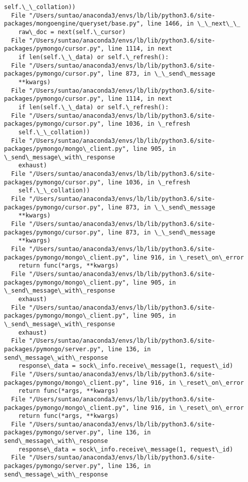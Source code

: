 \documentclass[11pt]{article}
\begin{document}
\begin{Verbatim}[commandchars=\\\{\}]
    self.\_\_collation))
  File "/Users/suntao/anaconda3/envs/lb/lib/python3.6/site-packages/mongoengine/queryset/base.py", line 1466, in \_\_next\_\_
    raw\_doc = next(self.\_cursor)
  File "/Users/suntao/anaconda3/envs/lb/lib/python3.6/site-packages/pymongo/cursor.py", line 1114, in next
    if len(self.\_\_data) or self.\_refresh():
  File "/Users/suntao/anaconda3/envs/lb/lib/python3.6/site-packages/pymongo/cursor.py", line 873, in \_\_send\_message
    **kwargs)
  File "/Users/suntao/anaconda3/envs/lb/lib/python3.6/site-packages/pymongo/cursor.py", line 1114, in next
    if len(self.\_\_data) or self.\_refresh():
  File "/Users/suntao/anaconda3/envs/lb/lib/python3.6/site-packages/pymongo/cursor.py", line 1036, in \_refresh
    self.\_\_collation))
  File "/Users/suntao/anaconda3/envs/lb/lib/python3.6/site-packages/pymongo/mongo\_client.py", line 905, in \_send\_message\_with\_response
    exhaust)
  File "/Users/suntao/anaconda3/envs/lb/lib/python3.6/site-packages/pymongo/cursor.py", line 1036, in \_refresh
    self.\_\_collation))
  File "/Users/suntao/anaconda3/envs/lb/lib/python3.6/site-packages/pymongo/cursor.py", line 873, in \_\_send\_message
    **kwargs)
  File "/Users/suntao/anaconda3/envs/lb/lib/python3.6/site-packages/pymongo/cursor.py", line 873, in \_\_send\_message
    **kwargs)
  File "/Users/suntao/anaconda3/envs/lb/lib/python3.6/site-packages/pymongo/mongo\_client.py", line 916, in \_reset\_on\_error
    return func(*args, **kwargs)
  File "/Users/suntao/anaconda3/envs/lb/lib/python3.6/site-packages/pymongo/mongo\_client.py", line 905, in \_send\_message\_with\_response
    exhaust)
  File "/Users/suntao/anaconda3/envs/lb/lib/python3.6/site-packages/pymongo/mongo\_client.py", line 905, in \_send\_message\_with\_response
    exhaust)
  File "/Users/suntao/anaconda3/envs/lb/lib/python3.6/site-packages/pymongo/server.py", line 136, in send\_message\_with\_response
    response\_data = sock\_info.receive\_message(1, request\_id)
  File "/Users/suntao/anaconda3/envs/lb/lib/python3.6/site-packages/pymongo/mongo\_client.py", line 916, in \_reset\_on\_error
    return func(*args, **kwargs)
  File "/Users/suntao/anaconda3/envs/lb/lib/python3.6/site-packages/pymongo/mongo\_client.py", line 916, in \_reset\_on\_error
    return func(*args, **kwargs)
  File "/Users/suntao/anaconda3/envs/lb/lib/python3.6/site-packages/pymongo/server.py", line 136, in send\_message\_with\_response
    response\_data = sock\_info.receive\_message(1, request\_id)
  File "/Users/suntao/anaconda3/envs/lb/lib/python3.6/site-packages/pymongo/server.py", line 136, in send\_message\_with\_response

\end{Verbatim}
\end{document}

